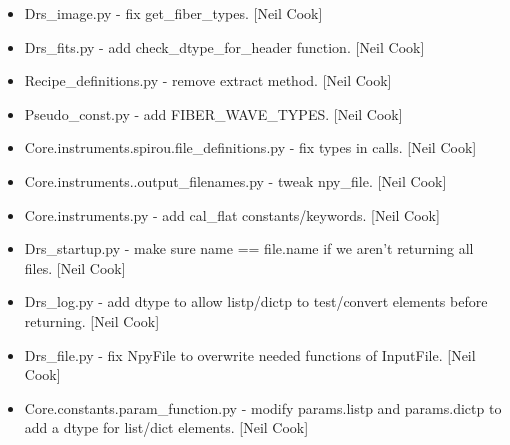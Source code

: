 \documentclass[a4paper,10pt,english]{report}
\begin{document}
\begin{itemize}
\item {} 
Drs\_image.py - fix get\_fiber\_types. {[}Neil Cook{]}

\item {} 
Drs\_fits.py - add check\_dtype\_for\_header function. {[}Neil Cook{]}

\item {} 
Recipe\_definitions.py - remove extract method. {[}Neil Cook{]}

\item {} 
Pseudo\_const.py - add FIBER\_WAVE\_TYPES. {[}Neil Cook{]}

\item {} 
Core.instruments.spirou.file\_definitions.py - fix types in calls.
{[}Neil Cook{]}

\item {} 
Core.instruments..output\_filenames.py - tweak npy\_file. {[}Neil Cook{]}

\item {} 
Core.instruments.py - add cal\_flat constants/keywords. {[}Neil Cook{]}

\item {} 
Drs\_startup.py - make sure name == file.name if we aren’t returning
all files. {[}Neil Cook{]}

\item {} 
Drs\_log.py - add dtype to allow listp/dictp to test/convert elements
before returning. {[}Neil Cook{]}

\item {} 
Drs\_file.py - fix NpyFile to overwrite needed functions of InputFile.
{[}Neil Cook{]}

\item {} 
Core.constants.param\_function.py - modify params.listp and
params.dictp to add a dtype for list/dict elements. {[}Neil Cook{]}

\end{itemize}
\end{document}

